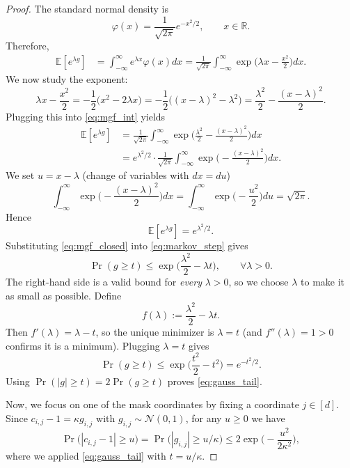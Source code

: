 \documentclass[10pt]{article} %
\theoremstyle{definition}
\theoremstyle{plain}
\begin{document}
\begin{proof}
The standard normal density is
\[
\varphi(x)=\frac{1}{\sqrt{2\pi}}e^{-x^2/2},\qquad x\in\mathbb R.
\]
Therefore,
\begin{align}
\mathbb E[e^{\lambda g}]
&=\int_{-\infty}^{\infty} e^{\lambda x} \varphi(x) dx
=\frac{1}{\sqrt{2\pi}}\int_{-\infty}^{\infty} \exp\!\Big(\lambda x-\frac{x^2}{2}\Big) dx.
\label{eq:mgf_int}
\end{align}
We now study the exponent:
\[
\lambda x-\frac{x^2}{2}
=-\frac{1}{2}\big(x^2-2\lambda x\big)
=-\frac{1}{2}\big((x-\lambda)^2-\lambda^2\big)
=\frac{\lambda^2}{2}-\frac{(x-\lambda)^2}{2}.
\]
Plugging this into \eqref{eq:mgf_int} yields
\begin{align*}
\mathbb E[e^{\lambda g}]
&=\frac{1}{\sqrt{2\pi}}\int_{-\infty}^{\infty}
\exp\!\Big(\frac{\lambda^2}{2}-\frac{(x-\lambda)^2}{2}\Big) dx
\\
&=e^{\lambda^2/2}\cdot \frac{1}{\sqrt{2\pi}}
\int_{-\infty}^{\infty} \exp\!\Big(-\frac{(x-\lambda)^2}{2}\Big) dx.
\end{align*}
We set $u=x-\lambda$ (change of variables with $dx=du$)
\[
\int_{-\infty}^{\infty} \exp\!\Big(-\frac{(x-\lambda)^2}{2}\Big) dx
=
\int_{-\infty}^{\infty} \exp\!\Big(-\frac{u^2}{2}\Big) du
=
\sqrt{2\pi}.
\]
Hence
\begin{equation}
\label{eq:mgf_closed}
\mathbb E[e^{\lambda g}] = e^{\lambda^2/2}.
\end{equation}
Substituting \eqref{eq:mgf_closed} into \eqref{eq:markov_step} gives
\[
\Pr(g\ge t)\le \exp\!\Big(\frac{\lambda^2}{2}-\lambda t\Big),
\qquad \forall \lambda>0.
\]
The right-hand side is a valid bound for \emph{every} $\lambda>0$, so we choose $\lambda$ to make it as small as possible.
Define
\[
f(\lambda):=\frac{\lambda^2}{2}-\lambda t.
\]
Then $f'(\lambda)=\lambda-t$, so the unique minimizer is $\lambda=t$ (and $f''(\lambda)=1>0$ confirms it is a minimum).
Plugging $\lambda=t$ gives
\[
\Pr(g\ge t)\le \exp\!\Big(\frac{t^2}{2}-t^2\Big)=e^{-t^2/2}.
\]
Using $\Pr(|g|\ge t)=2\Pr(g\ge t)$ proves \eqref{eq:gauss_tail}.

Now, we focus on one of the mask coordinates by fixing a coordinate $j\in[d]$. Since $c_{i,j}-1=\kappa g_{i,j}$ with $g_{i,j}\sim\mathcal N(0,1)$, for any $u\ge 0$ we have
\[
\Pr\big(|c_{i,j}-1|\ge u\big)
=
\Pr\big(|g_{i,j}|\ge u/\kappa\big)
\le
2\exp\!\Big(-\frac{u^2}{2\kappa^2}\Big),
\]
where we applied \eqref{eq:gauss_tail} with $t=u/\kappa$.


\end{proof}
\end{document}

